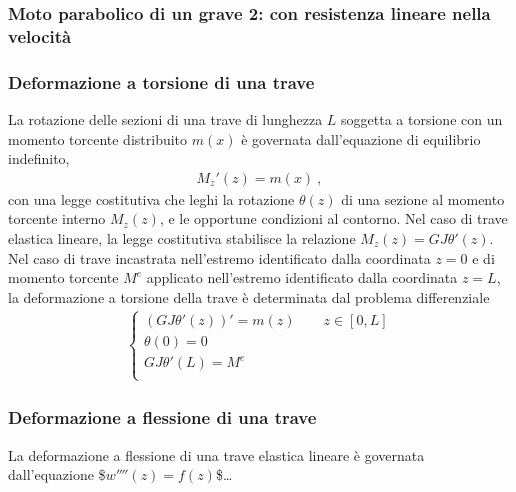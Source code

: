\documentclass[letterpaper,10pt,italian]{jupyterBook}
\begin{document}
\subsubsection*{Moto parabolico di un grave \sphinxhyphen{} 2: con resistenza lineare nella velocità}
\subsubsection*{Deformazione a torsione di una trave}

\sphinxAtStartPar
{} La rotazione delle sezioni di una trave di lunghezza \(L\) soggetta a torsione con un momento torcente distribuito \(m(x)\) è governata dall’equazione di equilibrio indefinito,
\begin{equation*}
\begin{split}M_z'(z) = m(x) \ ,\end{split}
\end{equation*}
\sphinxAtStartPar
con una legge costitutiva che leghi la rotazione \(\theta(z)\) di una sezione al momento torcente interno \(M_z(z)\), e le opportune condizioni al contorno. Nel caso di trave elastica lineare, la legge costitutiva stabilisce la relazione \(M_z(z) = GJ \theta'(z)\). Nel caso di trave incastrata nell’estremo identificato dalla coordinata \(z=0\) e di momento torcente \(M^e\) applicato nell’estremo identificato dalla coordinata \(z = L\), la deformazione a torsione della trave è determinata dal problema differenziale
\begin{equation*}
\begin{split}\begin{cases}
(GJ \theta'(z))' = m(z) \qquad z \in [0,L] \\
\theta(0) = 0 \\
GJ \theta'(L) = M^e \\
\end{cases}\end{split}
\end{equation*}\subsubsection*{Deformazione a flessione di una trave}

\sphinxAtStartPar
{} La deformazione a flessione di una trave elastica lineare è governata dall’equazione \$\(w''''(z) = f(z)\)\$… 
\end{document}
